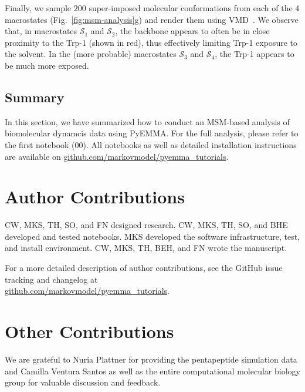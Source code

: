 \documentclass[9pt,tutorial]{livecoms}
\newcommand{\githubrepository}{\url{github.com/markovmodel/pyemma_tutorials}}
\begin{document}
Finally, we sample $200$ super-imposed molecular conformations from each of the $4$ macrostates (Fig.~\ref{fig:msm-analysis}g) and render them using VMD~\cite{vmd}.
We observe that, in macrostates $\mathcal{S}_1$ and $\mathcal{S}_2$, the backbone appears to often be in close proximity to the Trp-1 (shown in red), thus effectively limiting Trp-1 exposure to the solvent.
In the (more probable) macrostates $\mathcal{S}_3$ and $\mathcal{S}_4$, the Trp-1 appears to be much more exposed.

\subsection{Summary}

In this section, we have summarized how to conduct an MSM-based analysis of biomolecular dynamcis data using PyEMMA. For the full analysis, please refer to the first notebook (00). All notebooks as well as detailed installation instructions are available on \githubrepository{}.

\section{Author Contributions}
%
CW, MKS, TH, SO, and FN designed research.
CW, MKS, TH, SO, and BHE developed and tested notebooks.
MKS developed the software infrastructure, test, and install environment.
CW, MKS, TH, BEH, and FN wrote the manuscript.

For a more detailed description of author contributions, see the GitHub issue tracking and changelog at\\\githubrepository{}.

\section{Other Contributions}
%
We are grateful to Nuria Plattner for providing the pentapeptide simulation data and Camilla Ventura Santos as well as the entire computational molecular biology group for valuable discussion and feedback.
\end{document}
